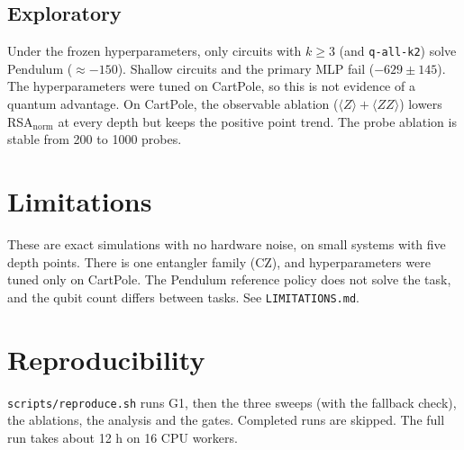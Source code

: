 \documentclass[11pt]{article}
\begin{document}
\subsection{Exploratory}
Under the frozen hyperparameters, only circuits with $k\ge3$ (and \texttt{q-all-k2}) solve Pendulum
($\approx-150$). Shallow circuits and the primary MLP fail ($-629\pm145$). The hyperparameters were tuned on
CartPole, so this is not evidence of a quantum advantage. On CartPole, the observable ablation ($\langle Z\rangle+\langle ZZ\rangle$)
lowers RSA$_{\text{norm}}$ at every depth but keeps the positive point trend. The probe ablation is stable from 200 to 1000 probes.

\section{Limitations}
These are exact simulations with no hardware noise, on small systems with five depth points.
There is one entangler family (CZ), and hyperparameters were tuned only on CartPole. The Pendulum reference policy does
not solve the task, and the qubit count differs between tasks. See \texttt{LIMITATIONS.md}.

\section{Reproducibility}
\texttt{scripts/reproduce.sh} runs G1, then the three sweeps (with the fallback check), the ablations, the analysis and the gates.
Completed runs are skipped. The full run takes about 12 h on 16 CPU workers.
\end{document}
